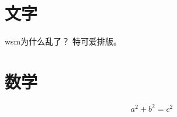 \documentclass[UTF8]{ctexart}
\begin{document}
\section{文字}
wsm为什么乱了？
特可爱排版。

\section{数学}
\[
  a^2 + b^2 = c^2
\]
\end{document}
